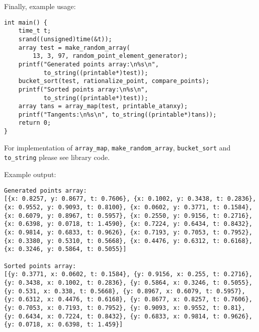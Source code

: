\documentclass[11pt]{article}
\begin{document}
Finally, example usage:
\lstset{language=C,label= ,caption= ,numbers=none}
\begin{lstlisting}
int main() {
    time_t t;
    srand((unsigned)time(&t));
    array test = make_random_array(
        13, 3, 97, random_point_element_generator);
    printf("Generated points array:\n%s\n",
           to_string((printable*)test));
    bucket_sort(test, rationalize_point, compare_points);
    printf("Sorted points array:\n%s\n",
           to_string((printable*)test));
    array tans = array_map(test, printable_atanxy);
    printf("Tangents:\n%s\n", to_string((printable*)tans));
    return 0;
}
\end{lstlisting}

For implementation of \texttt{array\_map}, \texttt{make\_random\_array}, \texttt{bucket\_sort} and
\texttt{to\_string} please see library code.

\pagebreak

Example output:
\begin{verbatim}
Generated points array:
[{x: 0.8257, y: 0.8677, t: 0.7606}, {x: 0.1002, y: 0.3438, t: 0.2836},
{x: 0.9552, y: 0.9093, t: 0.8100}, {x: 0.0602, y: 0.3771, t: 0.1584},
{x: 0.6079, y: 0.8967, t: 0.5957}, {x: 0.2550, y: 0.9156, t: 0.2716},
{x: 0.6398, y: 0.0718, t: 1.4590}, {x: 0.7224, y: 0.6434, t: 0.8432},
{x: 0.9814, y: 0.6833, t: 0.9626}, {x: 0.7193, y: 0.7053, t: 0.7952},
{x: 0.3380, y: 0.5310, t: 0.5668}, {x: 0.4476, y: 0.6312, t: 0.6168},
{x: 0.3246, y: 0.5864, t: 0.5055}]

Sorted points array:
[{y: 0.3771, x: 0.0602, t: 0.1584}, {y: 0.9156, x: 0.255, t: 0.2716},
{y: 0.3438, x: 0.1002, t: 0.2836}, {y: 0.5864, x: 0.3246, t: 0.5055},
{y: 0.531, x: 0.338, t: 0.5668}, {y: 0.8967, x: 0.6079, t: 0.5957},
{y: 0.6312, x: 0.4476, t: 0.6168}, {y: 0.8677, x: 0.8257, t: 0.7606},
{y: 0.7053, x: 0.7193, t: 0.7952}, {y: 0.9093, x: 0.9552, t: 0.81},
{y: 0.6434, x: 0.7224, t: 0.8432}, {y: 0.6833, x: 0.9814, t: 0.9626},
{y: 0.0718, x: 0.6398, t: 1.459}]
\end{verbatim}
\end{document}

